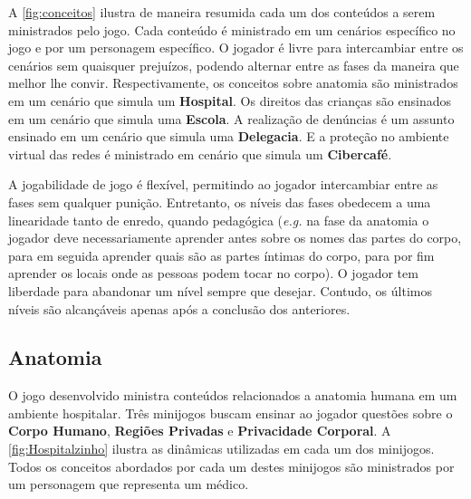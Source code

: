 A \autoref{fig:conceitos} ilustra de maneira resumida cada um dos conteúdos a serem ministrados pelo jogo. Cada conteúdo é ministrado em um cenários específico no jogo e por um personagem específico. O jogador é livre para intercambiar entre os cenários sem quaisquer prejuízos, podendo alternar entre as fases da maneira que melhor lhe convir. Respectivamente, os conceitos sobre anatomia são ministrados em um cenário que simula um \textbf{Hospital}. Os direitos das crianças são ensinados em um cenário que simula uma \textbf{Escola}. A realização de denúncias é um assunto ensinado em um cenário que simula uma \textbf{Delegacia}. E a proteção no ambiente virtual das redes é ministrado em cenário que simula um \textbf{Cibercafé}.

A jogabilidade de jogo é flexível, permitindo ao jogador intercambiar entre as fases sem qualquer punição. Entretanto, os níveis das fases obedecem a uma linearidade tanto de enredo, quando pedagógica (\textit{e.g.} na fase da anatomia o jogador deve necessariamente aprender antes sobre os nomes das partes do corpo, para em seguida aprender quais são as partes íntimas do corpo, para por fim aprender os locais onde as pessoas podem tocar no corpo). O jogador tem liberdade para abandonar um nível sempre que desejar. Contudo, os últimos níveis são alcançáveis apenas após a conclusão dos anteriores. 


\subsection{Anatomia}\label{subsec:1}

O jogo desenvolvido ministra conteúdos relacionados a anatomia humana em um ambiente hospitalar. Três minijogos buscam ensinar ao jogador questões sobre o \textbf{Corpo Humano}, \textbf{Regiões Privadas} e \textbf{Privacidade Corporal}. A \autoref{fig:Hospitalzinho} ilustra as dinâmicas utilizadas em cada um dos minijogos. Todos os conceitos abordados por cada um destes minijogos são ministrados por um personagem que representa um médico. 

